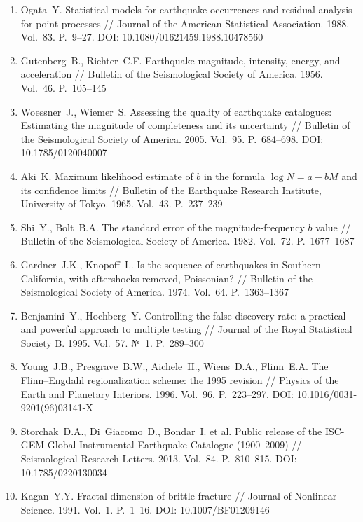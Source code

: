 \documentclass[12pt,a4paper]{article}
\begin{document}
\begin{enumerate}[leftmargin=*,label=\arabic*.]
\item Ogata~Y. Statistical models for earthquake occurrences and residual analysis
for point processes
// Journal of the American Statistical Association. 1988. Vol.~83. P.~9--27.
DOI: 10.1080/01621459.1988.10478560

\item Gutenberg~B., Richter~C.F. Earthquake magnitude, intensity, energy, and
acceleration
// Bulletin of the Seismological Society of America. 1956. Vol.~46. P.~105--145

\item Woessner~J., Wiemer~S. Assessing the quality of earthquake catalogues:
Estimating the magnitude of completeness and its uncertainty
// Bulletin of the Seismological Society of America. 2005. Vol.~95. P.~684--698.
DOI: 10.1785/0120040007

\item Aki~K. Maximum likelihood estimate of $b$ in the formula
$\log N = a - bM$ and its confidence limits
// Bulletin of the Earthquake Research Institute, University of Tokyo.
1965. Vol.~43. P.~237--239

\item Shi~Y., Bolt~B.A. The standard error of the magnitude-frequency $b$ value
// Bulletin of the Seismological Society of America. 1982. Vol.~72.
P.~1677--1687

\item Gardner~J.K., Knopoff~L. Is the sequence of earthquakes in Southern
California, with aftershocks removed, Poissonian?
// Bulletin of the Seismological Society of America. 1974. Vol.~64.
P.~1363--1367

\item Benjamini~Y., Hochberg~Y. Controlling the false discovery rate: a practical
and powerful approach to multiple testing
// Journal of the Royal Statistical Society B. 1995. Vol.~57. №~1.
P.~289--300

\item Young~J.B., Presgrave~B.W., Aichele~H., Wiens~D.A., Flinn~E.A.
The Flinn--Engdahl regionalization scheme: the 1995 revision
// Physics of the Earth and Planetary Interiors. 1996. Vol.~96. P.~223--297.
DOI: 10.1016/0031-9201(96)03141-X

\item Storchak~D.A., Di~Giacomo~D., Bondar~I. et al.
Public release of the ISC-GEM Global Instrumental Earthquake Catalogue
(1900--2009)
// Seismological Research Letters. 2013. Vol.~84. P.~810--815.
DOI: 10.1785/0220130034

\item Kagan~Y.Y. Fractal dimension of brittle fracture
// Journal of Nonlinear Science. 1991. Vol.~1. P.~1--16.
DOI: 10.1007/BF01209146

\end{enumerate}
\end{document}
